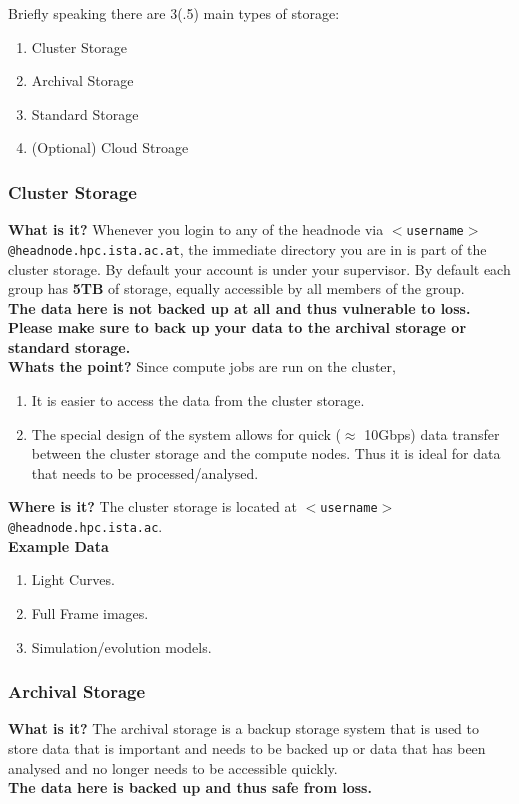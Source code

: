 \documentclass{article}
\begin{document}
Briefly speaking there are 3(.5) main types of storage:
\begin{enumerate}
    \item Cluster Storage
    \item Archival Storage
    \item Standard Storage
    \item (Optional) Cloud Stroage
\end{enumerate}
\subsubsection{Cluster Storage}
\textbf{What is it?}
\newline
Whenever you login to any of the headnode via \texttt{$<$username$>$@headnode.hpc.ista.ac.at}, the immediate directory you are in is part of the cluster storage. By default your account is under your supervisor. By default each group has \textbf{5TB} of storage, equally accessible by all members of the group.
\\
\textbf{The data here is not backed up at all and thus vulnerable to loss. Please make sure to back up your data to the archival storage or standard storage.}
\\

\noindent
\textbf{Whats the point?}
\newline
Since compute jobs are run on the cluster, 
\begin{enumerate}
    \item It is easier to access the data from the cluster storage.
    \item The special design of the system allows for quick ($\approx$ 10Gbps) data transfer between the cluster storage and the compute nodes. Thus it is ideal for data that needs to be processed/analysed.
\end{enumerate}

\noindent
\textbf{Where is it?}
\newline
The cluster storage is located at \texttt{$<$username$>$@headnode.hpc.ista.ac}.
\\

\noindent
\textbf{Example Data}
\begin{enumerate}
    \item Light Curves.
    \item Full Frame images.
    \item Simulation/evolution models.
\end{enumerate}
\subsubsection{Archival Storage}
\textbf{What is it?}
\newline
The archival storage is a backup storage system that is used to store data that is important and needs to be backed up or data that has been analysed and no longer needs to be accessible quickly.
\\
\textbf{The data here is backed up and thus safe from loss.}
\\
\end{document}
